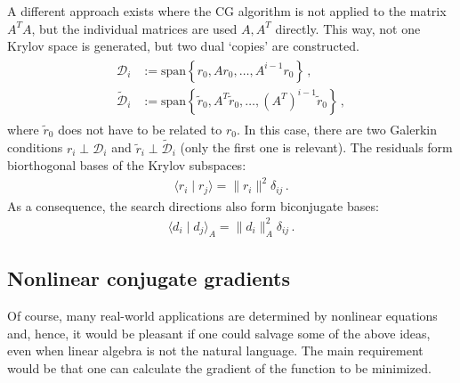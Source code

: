     A different approach exists where the CG algorithm is not applied to the matrix $A^T\!A$, but the individual matrices are used $A,A^T$ directly. This way, not one Krylov space is generated, but two dual `copies' are constructed.
    \begin{gather}
        \begin{aligned}
            \mathcal{D}_i &:= \mathrm{span}\left\{r_0,Ar_0,\ldots,A^{i-1}r_0\right\}\,,\\
            \widetilde{\mathcal{D}}_i &:= \mathrm{span}\left\{\widetilde{r}_0,A^T\widetilde{r}_0,\ldots,(A^T)^{i-1}\widetilde{r}_0\right\}\,,
        \end{aligned}
    \end{gather}
    where $\widetilde{r}_0$ does not have to be related to $r_0$. In this case, there are two Galerkin conditions $r_i\perp\mathcal{D}_i$ and $\widetilde{r}_i\perp\widetilde{\mathcal{D}}_i$ (only the first one is relevant). The residuals form biorthogonal bases of the Krylov subspaces:
    \begin{gather}
        \langle r_i\mid r_j \rangle = \|r_i\|^2\delta_{ij}\,.
    \end{gather}
    As a consequence, the search directions also form biconjugate bases:
    \begin{gather}
        \langle d_i\mid d_j \rangle_A = \|d_i\|_A^2\delta_{ij}\,.
    \end{gather}

\subsection{Nonlinear conjugate gradients}

    Of course, many real-world applications are determined by nonlinear equations and, hence, it would be pleasant if one could salvage some of the above ideas, even when linear algebra is not the natural language. The main requirement would be that one can calculate the gradient of the function to be minimized.

